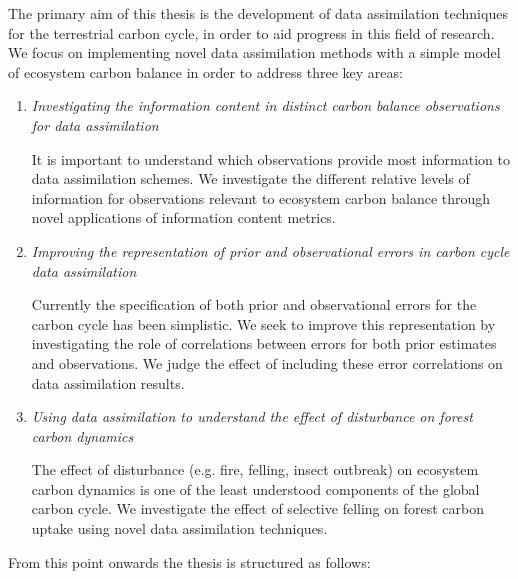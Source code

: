 
The primary aim of this thesis is the development of data assimilation techniques for the terrestrial carbon cycle, in order to aid progress in this field of research. We focus on implementing novel data assimilation methods with a simple model of ecosystem carbon balance in order to address three key areas:

\begin{enumerate}
\item \textit{Investigating the information content in distinct carbon balance observations for data assimilation}

It is important to understand which observations provide most information to data assimilation schemes. We investigate the different relative levels of information for observations relevant to ecosystem carbon balance through novel applications of information content metrics.

\item \textit{Improving the representation of prior and observational errors in carbon cycle data assimilation}

Currently the specification of both prior and observational errors for the carbon cycle has been simplistic. We seek to improve this representation by investigating the role of correlations between errors for both prior estimates and observations. We judge the effect of including these error correlations on data assimilation results.
  
\item \textit{Using data assimilation to understand the effect of disturbance on forest carbon dynamics}

The effect of disturbance (e.g. fire, felling, insect outbreak) on ecosystem carbon dynamics is one of the least understood components of the global carbon cycle. We investigate the effect of selective felling on forest carbon uptake using novel data assimilation techniques.
\end{enumerate}

From this point onwards the thesis is structured as follows:

